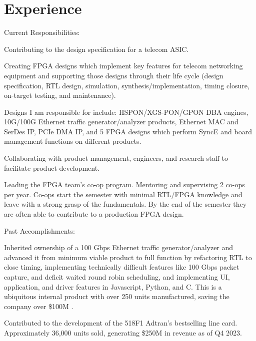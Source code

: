 \documentclass[10pt]{deedy-resume-reversed}
\begin{document}
\begin{minipage}[t]{1.0\textwidth}
\section{Experience}
Current Responsibilities:
\vspace{\topsep} %
\begin{tightemize}
\item Contributing to the design specification for a telecom ASIC. 
\item Creating FPGA designs which implement key features for telecom networking equipment and 
supporting those designs through their life cycle (design specification, RTL design, simulation, 
synthesis/implementation, timing closure, on-target testing, and maintenance).
\item Designs I am responsible for include: HSPON/XGS-PON/GPON DBA engines, 
10G/100G Ethernet traffic generator/analyzer products, 
Ethernet MAC and SerDes IP, PCIe DMA IP, and 5 FPGA designs which perform SyncE and board management functions on different products.
\item Collaborating with product management, engineers, and research staff to facilitate product development.
\item Leading the FPGA team's co-op program. Mentoring and supervising 2 co-ops per year. 
Co-ops start the semester with minimal RTL/FPGA knowledge and leave with a strong grasp of 
the fundamentals. By the end of the semester they are often able to contribute to a production FPGA design.
\end{tightemize}
Past Accomplishments:
\begin{tightemize}
\item Inherited ownership of a 100 Gbps Ethernet traffic generator/analyzer and advanced it from minimum viable product to full function by refactoring RTL to close timing, 
implementing technically difficult features like 100 Gbps packet capture, and deficit waited round robin scheduling, and implementing UI, application, 
and driver features in Javascript, Python, and C. This is a ubiquitous internal product with over 250 units manufactured, saving the company over \$100M .
\item Contributed to the development of the 518F1 Adtran’s bestselling line card. Approximately  36,000 units sold, generating \$250M in revenue as of Q4 2023. 

\end{tightemize}
\end{minipage}
\end{document}
